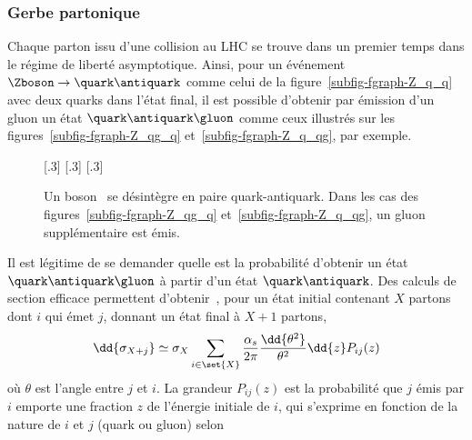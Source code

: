 \subsubsection{Gerbe partonique}\label{chapter-MSSM-formation_jets-subsec-gerbe-partonique}
Chaque parton issu d'une collision au LHC se trouve dans un premier temps dans le régime de liberté asymptotique.
Ainsi, pour un événement $\Zboson\to\quark\antiquark$ comme celui de la figure~\ref{subfig-fgraph-Z_q_q} avec deux quarks dans l'état final, il est possible d'obtenir par émission d'un gluon un état $\quark\antiquark\gluon$ comme ceux illustrés sur les figures~\ref{subfig-fgraph-Z_qg_q} et~\ref{subfig-fgraph-Z_q_qg}, par exemple.
\begin{figure}[h]
\centering\vspace{\baselineskip}
\subcaptionbox{\label{subfig-fgraph-Z_q_q}}[.3\textwidth]
{\vspace{\baselineskip}}
\hfill
\subcaptionbox{\label{subfig-fgraph-Z_qg_q}}[.3\textwidth]
{\vspace{\baselineskip}}
\hfill
\subcaptionbox{\label{subfig-fgraph-Z_q_qg}}[.3\textwidth]
{\vspace{\baselineskip}}
\caption[Un boson \Zboson\ se désintègre en paire quark-antiquark.]{Un boson \Zboson\ se désintègre en paire quark-antiquark. Dans les cas des figures~\ref{subfig-fgraph-Z_qg_q} et~\ref{subfig-fgraph-Z_q_qg}, un gluon supplémentaire est émis.}
\label{fig-fgraph-Z_q_q_xg}
\end{figure}
\par Il est légitime de se demander quelle est la probabilité d'obtenir un état $\quark\antiquark\gluon$ à partir d'un état $\quark\antiquark$.
Des calculs de section efficace permettent d'obtenir~\cite{salam2010elements}, pour un état initial contenant $X$ partons dont $i$ qui émet $j$, donnant un état final à $X+1$ partons,
\begin{equation}
\dd{\sigma_{X+j}} \simeq \sigma_{X} \sum_{i\in\set{X}} \frac{\alpha_s}{2\pi} \frac{\dd{\theta^2}}{\theta^2} \dd{z} P_{ij}(z)
\end{equation}
où $\theta$ est l'angle entre $j$ et $i$.
La grandeur $P_{ij}(z)$ est la probabilité que $j$ émis par $i$ emporte une fraction $z$ de l'énergie initiale de $i$, qui s'exprime en fonction de la nature de $i$ et $j$ (quark ou gluon) selon
